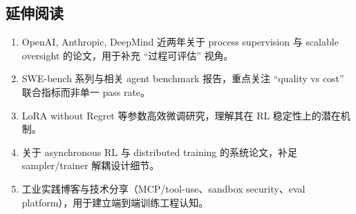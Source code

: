 \documentclass[a4paper]{article}
\begin{document}
\subsection*{延伸阅读}
\begin{enumerate}
    \item OpenAI, Anthropic, DeepMind 近两年关于 process supervision 与 scalable oversight 的论文，用于补充 ``过程可评估'' 视角。
    \item SWE-bench 系列与相关 agent benchmark 报告，重点关注 ``quality vs cost'' 联合指标而非单一 pass rate。
    \item LoRA without Regret 等参数高效微调研究，理解其在 RL 稳定性上的潜在机制。
    \item 关于 asynchronous RL 与 distributed training 的系统论文，补足 sampler/trainer 解耦设计细节。
    \item 工业实践博客与技术分享（MCP/tool-use、sandbox security、eval platform），用于建立端到端训练工程认知。
\end{enumerate}
\end{document}
